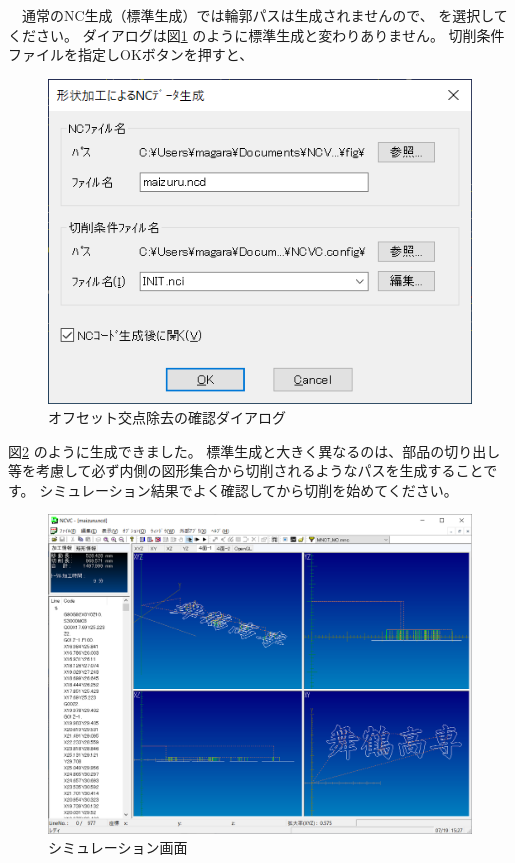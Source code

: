 

\vspace*{1zh}
　通常のNC生成（標準生成）では輪郭パスは生成されませんので、 を選択してください。
ダイアログは図\ref{fig:make} のように標準生成と変わりありません。
切削条件ファイルを指定しOKボタンを押すと、

\begin{figure}[H]
\centering
\includegraphics{No5/fig/dialog.png}
\caption{オフセット交点除去の確認ダイアログ}
\label{fig:make}
\end{figure}

図\ref{fig:simu} のように生成できました。
標準生成と大きく異なるのは、部品の切り出し等を考慮して必ず内側の図形集合から切削されるようなパスを生成することです。
シミュレーション結果でよく確認してから切削を始めてください。

\begin{figure}[H]
\centering
\includegraphics[scale=0.55]{No5/fig/maizuru.png}
\caption{シミュレーション画面}
\label{fig:simu}
\end{figure}
